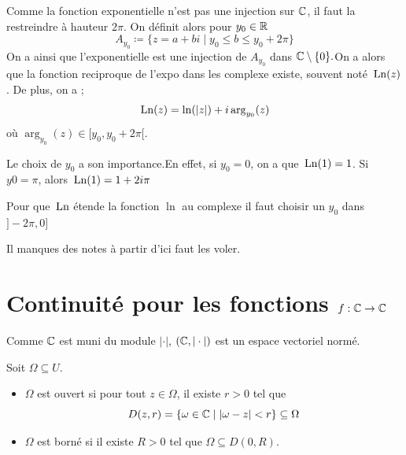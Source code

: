 \begin{definition}
    Comme la fonction exponentielle n'est pas une injection sur $\mathbb{C}$, il faut la restreindre à hauteur $2\pi$. On définit alors pour $y_0\in\mathbb{R}$
    $$A_{y_0}\coloneqq\{z=a+bi\mid y_0\le b\le y_0+2\pi\}$$
    On a ainsi que l'exponentielle est une injection de $A_{y_0}$ dans $\mathbb{C}\setminus\{0\}.$On a alors que la fonction reciproque de l'expo dans les complexe existe, souvent noté ${\,\operatorname{Ln}}(z)$. De plus, on a ;
    $${\,\operatorname{Ln}}(z)=\ln(\left| z \right|)+i\arg_{y_0}(z)$$
    où $\arg_{y_0}(z)\in[y_0,y_0+2\pi[$.
\end{definition}
\begin{remarque}
    Le choix de $y_0$ a son importance.En effet, si $y_0=0$, on a que ${\,\operatorname{Ln}}(1)=1$. Si $y0=\pi$, alors ${\,\operatorname{Ln}}(1)=1+2i \pi$
\end{remarque}
\begin{remarque}
    Pour que ${\,\operatorname{Ln}}$ étende la fonction $\ln$ au complexe il faut choisir un $y_0$ dans $]-2\pi,0]$
\end{remarque}

Il manques des notes à partir d'ici faut les voler.

\section{Continuité pour les fonctions $f:\mathbb{C}\to\mathbb{C}$}

Comme $\mathbb{C}$ est muni du module $|\cdot |$, $( \mathbb{C}, |\cdot| )$ est un espace vectoriel normé.
\begin{definition}
    Soit $\Omega\subseteq U$. 
    \begin{itemize}
        \item $\Omega$ est ouvert si pour tout $z\in \Omega$, il existe $r>0$ tel que $$D(z,r) = \{\omega\in \mathbb{C}\mid \left| \omega - z \right|<r\}\subseteq \Omega$$
        \item $\Omega$ est borné si il existe $R>0$ tel que $\Omega \subseteq D(0, R)$.
    \end{itemize}
\end{definition}

